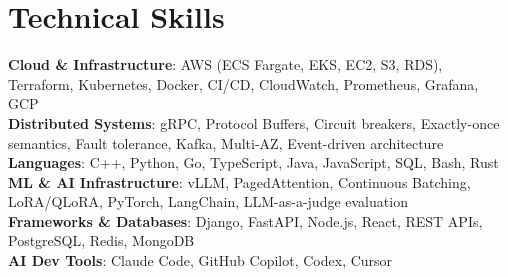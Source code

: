 \documentclass[letterpaper,11pt]{article}
\begin{document}
\section{Technical Skills}
\vspace{-7pt}
\begin{itemize}
[leftmargin=0.15in, label={}]\small{\item{
        \textbf{Cloud \& Infrastructure}{: AWS (ECS Fargate, EKS, EC2, S3, RDS), Terraform, Kubernetes, Docker, CI/CD, CloudWatch, Prometheus, Grafana, GCP} \\
        \textbf{Distributed Systems}{: gRPC, Protocol Buffers, Circuit breakers, Exactly-once semantics, Fault tolerance, Kafka, Multi-AZ, Event-driven architecture} \\
        \textbf{Languages}{: C++, Python, Go, TypeScript, Java, JavaScript, SQL, Bash, Rust} \\
        \textbf{ML \& AI Infrastructure}{: vLLM, PagedAttention, Continuous Batching, LoRA/QLoRA, PyTorch, LangChain, LLM-as-a-judge evaluation} \\
        \textbf{Frameworks \& Databases}{: Django, FastAPI, Node.js, React, REST APIs, PostgreSQL, Redis, MongoDB} \\
        \textbf{AI Dev Tools}{: Claude Code, GitHub Copilot, Codex, Cursor} \\
}}
\end{itemize}
\end{document}
